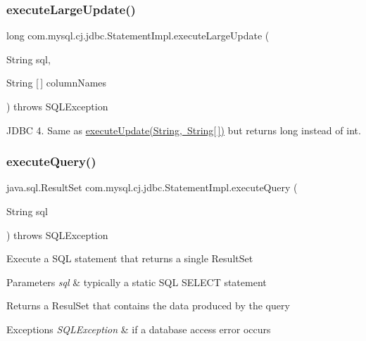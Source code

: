 \subsubsection{\texorpdfstring{execute\+Large\+Update()}{executeLargeUpdate()}\hspace{0.1cm}{\footnotesize\ttfamily [4/4]}}
{\footnotesize\ttfamily long com.\+mysql.\+cj.\+jdbc.\+Statement\+Impl.\+execute\+Large\+Update (\begin{DoxyParamCaption}\item[{String}]{sql,  }\item[{String \mbox{[}$\,$\mbox{]}}]{column\+Names }\end{DoxyParamCaption}) throws S\+Q\+L\+Exception}

J\+D\+BC 4. Same as \mbox{\hyperlink{}{execute\+Update(\+String, String\mbox{[}$\,$\mbox{]})}} but returns long instead of int. \mbox{\label{classcom_1_1mysql_1_1cj_1_1jdbc_1_1_statement_impl_ad8bdf41d3e788681fe1adcf961b176ef}} 
\subsubsection{\texorpdfstring{execute\+Query()}{executeQuery()}}
{\footnotesize\ttfamily java.\+sql.\+Result\+Set com.\+mysql.\+cj.\+jdbc.\+Statement\+Impl.\+execute\+Query (\begin{DoxyParamCaption}\item[{String}]{sql }\end{DoxyParamCaption}) throws S\+Q\+L\+Exception}

Execute a S\+QL statement that returns a single Result\+Set


\begin{DoxyParams}{Parameters}
{\em sql} & typically a static S\+QL S\+E\+L\+E\+CT statement\\
\hline
\end{DoxyParams}
\begin{DoxyReturn}{Returns}
a Resul\+Set that contains the data produced by the query
\end{DoxyReturn}

\begin{DoxyExceptions}{Exceptions}
{\em S\+Q\+L\+Exception} & if a database access error occurs \\
\hline
\end{DoxyExceptions}
\mbox{\label{classcom_1_1mysql_1_1cj_1_1jdbc_1_1_statement_impl_a27a4381bb8f1b302a3f8e06cf3276023}} 
